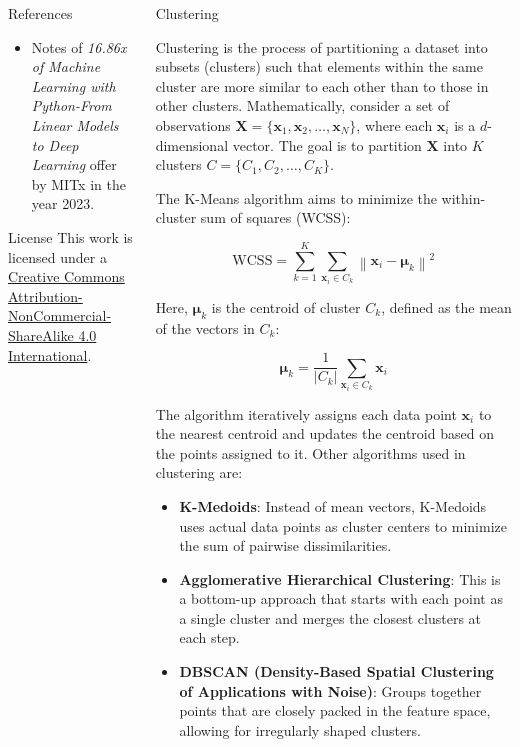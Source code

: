 \documentclass{beamer}
\begin{document}
\begin{columns}
\begin{column}{0.3\textwidth}
\begin{block}{References}
    \begin{itemize}
        \item Notes of \textit{16.86x of Machine Learning with Python-From Linear Models to Deep Learning} offer by MITx in the year 2023.
    \end{itemize}
\end{block}

\begin{block}{License}
This work is licensed under a \href{https://creativecommons.org/licenses/by-nc-sa/4.0/}{Creative Commons Attribution-NonCommercial-ShareAlike 4.0 International}. \ccbyncsa
\end{block}

\end{column}
\begin{column}{0.3\textwidth}

\begin{block}{Clustering}

Clustering is the process of partitioning a dataset into subsets (clusters) such that elements within the same cluster are more similar to each other than to those in other clusters. Mathematically, consider a set of observations \( \mathbf{X} = \{ \mathbf{x}_1, \mathbf{x}_2, \ldots, \mathbf{x}_N \} \), where each \( \mathbf{x}_i \) is a \( d \)-dimensional vector. The goal is to partition \( \mathbf{X} \) into \( K \) clusters \( C = \{ C_1, C_2, \ldots, C_K \} \).

The K-Means algorithm aims to minimize the within-cluster sum of squares (WCSS):

\[
\text{WCSS} = \sum_{k=1}^{K} \sum_{\mathbf{x}_i \in C_k} \left\| \mathbf{x}_i - \mathbf{\mu}_k \right\|^2
\]

Here, \( \mathbf{\mu}_k \) is the centroid of cluster \( C_k \), defined as the mean of the vectors in \( C_k \):

\[
\mathbf{\mu}_k = \frac{1}{|C_k|} \sum_{\mathbf{x}_i \in C_k} \mathbf{x}_i
\]

The algorithm iteratively assigns each data point \( \mathbf{x}_i \) to the nearest centroid and updates the centroid based on the points assigned to it. Other algorithms used in clustering are: 

\begin{itemize}
    \item \textbf{K-Medoids}: Instead of mean vectors, K-Medoids uses actual data points as cluster centers to minimize the sum of pairwise dissimilarities.
    \item \textbf{Agglomerative Hierarchical Clustering}: This is a bottom-up approach that starts with each point as a single cluster and merges the closest clusters at each step.
    \item \textbf{DBSCAN (Density-Based Spatial Clustering of Applications with Noise)}: Groups together points that are closely packed in the feature space, allowing for irregularly shaped clusters.
\end{itemize}


\end{block}
\end{column}
\end{columns}
\end{document}
